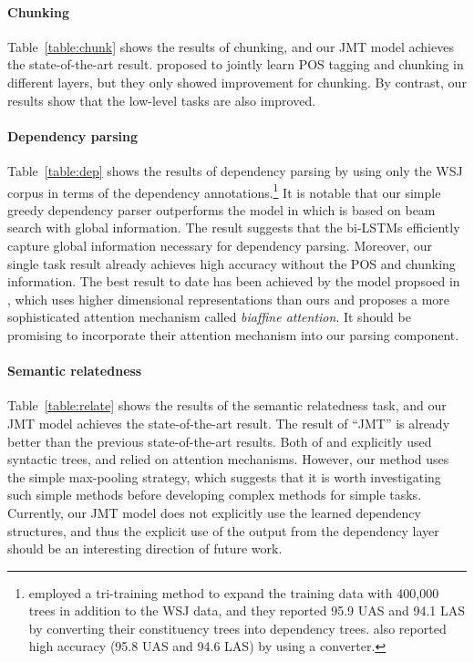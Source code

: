\documentclass[11pt,a4paper]{article}
\begin{document}
\paragraph{Chunking}
Table~\ref{table:chunk} shows the results of chunking, and our JMT model achieves the state-of-the-art result.
\citet{sogaard2016} proposed to jointly learn POS tagging and chunking in different layers, but they only showed improvement for chunking.
By contrast, our results show that the low-level tasks are also improved.


\paragraph{Dependency parsing}
Table~\ref{table:dep} shows the results of dependency parsing by using only the WSJ corpus in terms of the dependency annotations.\footnote{\citet{choe2016dep} employed a tri-training method to expand the training data with 400,000 trees in addition to the WSJ data, and they reported 95.9 UAS and 94.1 LAS by converting their constituency trees into dependency trees.
\citet{kuncoro2017} also reported high accuracy (95.8 UAS and 94.6 LAS) by using a converter.
}
It is notable that our simple greedy dependency parser outperforms the model in \citet{andor2016} which is based on beam search with global information.
The result suggests that the bi-LSTMs efficiently capture global information necessary for dependency parsing.
Moreover, our single task result already achieves high accuracy without the POS and chunking information.
The best result to date has been achieved by the model propsoed in \citet{biaffine2017}, which uses higher dimensional representations than ours and proposes a more sophisticated attention mechanism called {\it biaffine attention}.
It should be promising to incorporate their attention mechanism into our parsing component.

\paragraph{Semantic relatedness}
Table~\ref{table:relate} shows the results of the semantic relatedness task, and our JMT model achieves the state-of-the-art result.
The result of ``JMT'' is already better than the previous state-of-the-art results.
Both of \citet{zhou2016coling} and \citet{tai2015treelstm} explicitly used syntactic trees, and \citet{zhou2016coling} relied on attention mechanisms.
However, our method uses the simple max-pooling strategy, which suggests that it is worth investigating such simple methods before developing complex methods for simple tasks.
Currently, our JMT model does not explicitly use the learned dependency structures, and thus the explicit use of the output from the dependency layer should be an interesting direction of future work.
\end{document}

